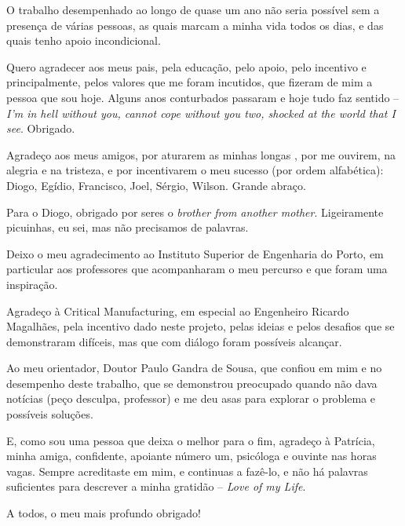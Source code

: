 \begin{acknowledgements}

O trabalho desempenhado ao longo de quase um ano não seria possível sem a presença de várias pessoas, as quais marcam a minha vida todos os dias, e das quais tenho apoio incondicional.

Quero agradecer aos meus pais, pela educação, pelo apoio, pelo incentivo e principalmente, pelos valores que me foram incutidos, que fizeram de mim a pessoa que sou hoje. Alguns anos conturbados passaram e hoje tudo faz sentido -- \textit{I'm in hell without you, cannot cope without you two, shocked at the world that I see}. Obrigado.

Agradeço aos meus amigos, por aturarem as minhas longas , por me ouvirem, na alegria e na tristeza, e por incentivarem o meu sucesso (por ordem alfabética): Diogo, Egídio, Francisco, Joel, Sérgio, Wilson. Grande abraço.

Para o Diogo, obrigado por seres o \textit{brother from another mother}. Ligeiramente picuinhas, eu sei, mas não precisamos de palavras.

Deixo o meu agradecimento ao Instituto Superior de Engenharia do Porto, em particular aos professores que acompanharam o meu percurso e que foram uma inspiração. 

Agradeço à Critical Manufacturing, em especial ao Engenheiro Ricardo Magalhães, pela incentivo dado neste projeto, pelas ideias e pelos desafios que se demonstraram difíceis, mas que com diálogo foram possíveis alcançar.

Ao meu orientador, Doutor Paulo Gandra de Sousa, que confiou em mim e no desempenho deste trabalho, que se demonstrou preocupado quando não dava notícias (peço desculpa, professor) e me deu asas para explorar o problema e possíveis soluções.

E, como sou uma pessoa que deixa o melhor para o fim, agradeço à Patrícia, minha amiga, confidente, apoiante número um, psicóloga e ouvinte nas horas vagas. Sempre acreditaste em mim, e continuas a fazê-lo, e não há palavras suficientes para descrever a minha gratidão -- \textit{Love of my Life}.

A todos, o meu mais profundo obrigado!
\end{acknowledgements}